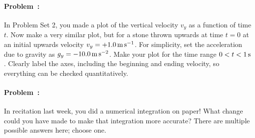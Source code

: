 \documentclass[12pt]{article}
\begin{document}
\vfill

\paragraph{Problem~\theproblem:}%
In Problem Set 2, you made a plot of the vertical velocity $v_y$ as a
function of time $t$. Now make a very similar plot, but for a stone
thrown upwards at time $t=0$ at an initial upwards velocity
$v_y=+1.0\,\mathrm{m}\,\mathrm{s}^{-1}$. For simplicity, set the acceleration due to
gravity as $g_y=-10.0\,\mathrm{m}\,\mathrm{s}^{-2}$. Make your plot for the time range
$0<t<1\,\mathrm{s}$. Clearly label the axes, including the beginning and
ending velocity, so everything can be checked quantitatively.

\vfill

\paragraph{Problem~\theproblem:}%
In recitation last week, you did a numerical integration on
paper! What change could you have made to make that integration more
accurate? There are multiple possible answers here; choose one.

\vfill
~
\end{document}
